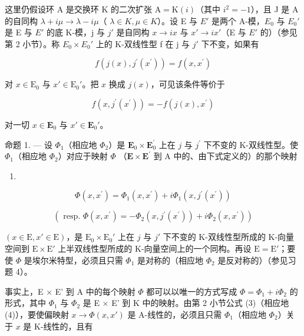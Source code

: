 这里仍假设环 A 是交换环 K 的二次扩张 \(\mathrm{A} = \mathrm{K}(i)\)（其中 \(i^{2} = -1\)），且 J 是 A 的自同构 \(\lambda + i\mu \to \lambda - i\mu\)（ \(\lambda \in K, \mu \in K\)）。设 E 与 \(E'\) 是两个 A-模，\(E_{0}\) 与 \(E_{0}'\) 是 E 与 \(E'\) 的底 K-模，j 与 \(j'\) 是自同构 \(x \to ix\) 与 \(x' \to ix'\)（E 与 \(E'\) 的）（参见第 2 小节）。称 \(E_{0} \times E_{0}'\) 上的 K-双线性型 f 在 j 与 \(j'\) 下不变，如果有

\[
f (j (x), j ^ {\prime} (x ^ {\prime})) = f (x, x ^ {\prime})\tag{5}
\]

对 \(x \in \mathrm{E}_0\) 与 \(x' \in \mathrm{E}_0'\)。把 \(x\) 换成 \(j(x)\)，可见该条件等价于

\[
f (x, j ^ {\prime} (x ^ {\prime})) = - f (j (x), x ^ {\prime})\tag{6}
\]

对一切 \(x \in \mathbf{E}_0\) 与 \(x' \in \mathbf{E}_0'\)。

命题 1. --- 设 \(\Phi_{1}\)（相应地 \(\Phi_{2}\)）是 \(\mathbf{E}_{0} \times \mathbf{E}_{0}^{\prime}\) 上在 \(j\) 与 \(j^{\prime}\) 下不变的 K-双线性型。使 \(\Phi_{1}\)（相应地 \(\Phi_{2}\)）对应于映射 \(\Phi\) （\(\mathbf{E} \times \mathbf{E}^{\prime}\) 到 A 中的、由下式定义的）的那个映射

\begin{enumerate}
\def\labelenumi{(\arabic{enumi})}
\setcounter{enumi}{6}
\tightlist
\item
\end{enumerate}

\[
\Phi (x, x ^ {\prime}) = \Phi_ {1} (x, x ^ {\prime}) + i \Phi_ {1} (x, j ^ {\prime} (x ^ {\prime}))\tag{8}
\]

\[
(\text { resp. } \Phi (x, x ^ {\prime}) = - \Phi_ {2} (x, j ^ {\prime} (x ^ {\prime})) + i \Phi_ {2} (x, x ^ {\prime}))
\]

\((x \in \mathrm{E}, x' \in \mathrm{E})\)，是 \(\mathrm{E}_0 \times \mathrm{E}_0'\) 上在 \(j\) 与 \(j'\) 下不变的 K-双线性型所成的 K-向量空间到 \(\mathrm{E} \times \mathrm{E}'\) 上半双线性型所成的 K-向量空间上的一个同构。再设 \(\mathrm{E} = \mathrm{E}'\)；要使 \(\Phi\) 是埃尔米特型，必须且只需 \(\Phi_1\) 是对称的（相应地 \(\Phi_2\) 是反对称的）（参见习题 4）。

事实上，E × E' 到 A 中的每个映射 \(\Phi\) 都可以以唯一的方式写成 \(\Phi = \Phi_1 + i\Phi_2\) 的形式，其中 \(\Phi_1\) 与 \(\Phi_2\) 是 E × E' 到 K 中的映射。由第 2 小节公式 (3)（相应地 (4)），要使偏映射 \(x \to \Phi(x, x')\) 是 A-线性的，必须且只需 \(\Phi_1\)（相应地 \(\Phi_2\)）关于 \(x\) 是 K-线性的，且有

